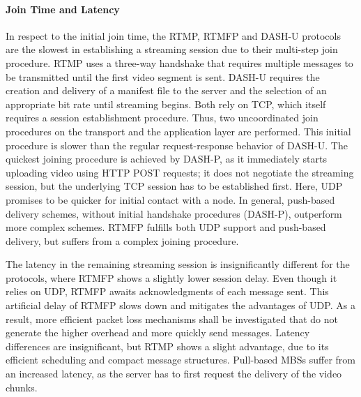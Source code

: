 \paragraph{Join Time and Latency}
In respect to the initial join time, the \ac{RTMP}, \ac{RTMFP} and \ac{DASH-U} protocols are the slowest in establishing a streaming session due to their multi-step join procedure.
\ac{RTMP} uses a three-way handshake that requires multiple messages to be transmitted until the first video segment is sent.
\ac{DASH-U} requires the creation and delivery of a manifest file to the server and the selection of an appropriate bit rate until streaming begins.
Both rely on \ac{TCP}, which itself requires a session establishment procedure.
Thus, two uncoordinated join procedures on the transport and the application layer are performed.
This initial procedure is slower than the regular request-response behavior of \ac{DASH-U}.
The quickest joining procedure is achieved by \ac{DASH-P}, as it immediately starts uploading video using \ac{HTTP} POST requests; it does not negotiate the streaming session, but the underlying \ac{TCP} session has to be established first.
Here, \ac{UDP} promises to be quicker for initial contact with a node. 
In general, push-based delivery schemes, without initial handshake procedures (\ac{DASH-P}), outperform more complex schemes. 
\ac{RTMFP} fulfills both \ac{UDP} support and push-based delivery, but suffers from a complex joining procedure. 

The latency in the remaining streaming session is insignificantly different for the protocols, where \ac{RTMFP} shows a slightly lower session delay.
Even though it relies on \ac{UDP}, \ac{RTMFP} awaits acknowledgments of each message sent. This artificial delay of \ac{RTMFP} slows down and mitigates the advantages of \ac{UDP}.
As a result, more efficient packet loss mechanisms shall be investigated that do not generate the higher overhead and more quickly send messages.
Latency differences are insignificant, but \ac{RTMP} shows a slight advantage, due to its efficient scheduling and compact message structures. 
Pull-based \ac{MBS}s suffer from an increased latency, as the server has to first request the delivery of the video chunks.
